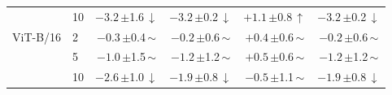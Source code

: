 \begin{table}[htbp]
\begin{tabular}{llcccc}
 & 10 & $-3.2$\,{\scriptsize$\pm$1.6}\,$\downarrow$ & $-3.2$\,{\scriptsize$\pm$0.2}\,$\downarrow$ & $+1.1$\,{\scriptsize$\pm$0.8}\,$\uparrow$ & $-3.2$\,{\scriptsize$\pm$0.2}\,$\downarrow$ \\
\addlinespace[2pt]
ViT-B/16 & 2 & $-0.3$\,{\scriptsize$\pm$0.4}\,$\sim$ & $-0.2$\,{\scriptsize$\pm$0.6}\,$\sim$ & $+0.4$\,{\scriptsize$\pm$0.6}\,$\sim$ & $-0.2$\,{\scriptsize$\pm$0.6}\,$\sim$ \\
 & 5 & $-1.0$\,{\scriptsize$\pm$1.5}\,$\sim$ & $-1.2$\,{\scriptsize$\pm$1.2}\,$\sim$ & $+0.5$\,{\scriptsize$\pm$0.6}\,$\sim$ & $-1.2$\,{\scriptsize$\pm$1.2}\,$\sim$ \\
 & 10 & $-2.6$\,{\scriptsize$\pm$1.0}\,$\downarrow$ & $-1.9$\,{\scriptsize$\pm$0.8}\,$\downarrow$ & $-0.5$\,{\scriptsize$\pm$1.1}\,$\sim$ & $-1.9$\,{\scriptsize$\pm$0.8}\,$\downarrow$ \\
\bottomrule
\end{tabular}
\end{table}
